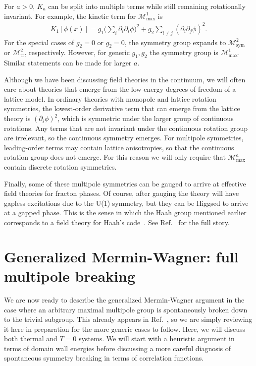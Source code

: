 \documentclass[prb,aps,twocolumn, amsfonts,amsmath,amssymb,nofootinbib,superscriptaddress]{revtex4-2}
\renewcommand{\max}{\text{max}}
\newcommand{\mmax}[1]{\mathcal{M}^{#1}_\max}
\begin{document}
For $a>0$, $K_a$ can be split into multiple terms while still remaining rotationally invariant. For example, the kinetic term for $\mathcal{M}^1_\max$ is 
\begin{align}
K_1[\phi(x)] = g_1 \big(\sum_{i} \partial_i \partial_i \phi\big)^2 + g_2 \sum_{i \ne j} (\partial_i \partial_j \phi)^2.
\end{align}
For the special cases of $g_2=0$ or $g_2=0$, the symmetry group expands to $\mathcal{M}^2_\text{sym}$ or $\mathcal{M}^2_\text{tr}$, respectively. However, for generic $g_1,g_2$ the symmetry group is $\mathcal{M}^1_\max$. Similar statements can be made for larger $a$.

Although we have been discussing field theories in the continuum, we will often care about theories that emerge from the low-energy degrees of freedom of a lattice model. In ordinary theories with monopole and lattice rotation symmetries, the lowest-order derivative term that can emerge from the lattice theory is $(\partial_i \phi)^2$, which is symmetric under the larger group of continuous rotations. Any terms that are not invariant under the continuous rotation group are irrelevant, so the continuous symmetry emerges. For multipole symmetries, leading-order terms may contain lattice anisotropies, so that the continuous rotation group does not emerge. For this reason we will only require that $\mmax{a}$ contain discrete rotation symmetries.

Finally, some of these multipole symmetries can be gauged to arrive at effective field theories for fracton phases. Of course, after gauging the theory will have gapless excitations due to the U(1) symmetry, but they can be Higgsed to arrive at a gapped phase. This is the sense in which the Haah group mentioned earlier corresponds to a field theory for Haah's code~\cite{BB}. See Ref.~\cite{BB, Gromov2019} for the full story. 

\section{Generalized Mermin-Wagner: full multipole breaking}\label{sec:full_breaking}

We are now ready to describe the generalized Mermin-Wagner argument in the case where an arbitrary maximal multipole group is spontaneously broken down to the trivial subgroup. This already appears in Ref.~\cite{Griffin2015}, so we are simply reviewing it here in preparation for the more generic cases to follow. Here, we will discuss both thermal and $T=0$ systems. We will start with a heuristic argument in terms of domain wall energies before discussing a more careful diagnosis of spontaneous symmetry breaking in terms of correlation functions.
\end{document}
